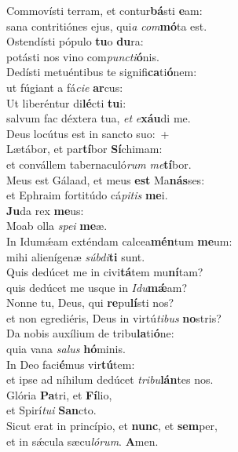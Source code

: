 \evenverse Commovísti terram, et contur\textbf{bá}sti \textbf{e}am:~\*\\
\evenverse sana contritiónes ejus, qui\textit{a} \textit{com}\textbf{mó}ta est.\\
\oddverse Ostendísti pópulo \textbf{tu}o \textbf{du}ra:~\*\\
\oddverse potásti nos vino com\textit{pun}\textit{cti}\textbf{ó}nis.\\
\evenverse Dedísti metuéntibus te signifi\textbf{ca}ti\textbf{ó}nem:~\*\\
\evenverse ut fúgiant a fá\textit{ci}\textit{e} \textbf{ar}cus:\\
\oddverse Ut liberéntur di\textbf{lé}cti \textbf{tu}i:~\*\\
\oddverse salvum fac déxtera tua, \textit{et} \textit{e}\textbf{xáu}di me.\\
\evenverse Deus locútus est in sancto suo:~+\\
\evenverse  Lætábor, et par\textbf{tí}bor \textbf{Sí}chimam:~\*\\
\evenverse et convállem tabernaculó\textit{rum} \textit{me}\textbf{tí}bor.\\
\oddverse Meus est Gálaad, et meus \textbf{est} Ma\textbf{nás}ses:~\*\\
\oddverse et Ephraim fortitúdo cá\textit{pi}\textit{tis} \textbf{me}i.\\
\evenverse \textbf{Ju}da rex \textbf{me}us:~\*\\
\evenverse Moab olla \textit{spe}\textit{i} \textbf{me}æ.\\
\oddverse In Idumǽam exténdam calcea\textbf{mén}tum \textbf{me}um:~\*\\
\oddverse mihi alienígenæ \textit{súb}\textit{di}\textbf{ti} sunt.\\
\evenverse Quis dedúcet me in civi\textbf{tá}tem mu\textbf{ní}tam?~\*\\
\evenverse quis dedúcet me usque in \textit{I}\textit{du}\textbf{mǽ}am?\\
\oddverse Nonne tu, Deus, qui \textbf{re}pu\textbf{lí}sti nos?~\*\\
\oddverse et non egrediéris, Deus in virtú\textit{ti}\textit{bus} \textbf{no}stris?\\
\evenverse Da nobis auxílium de tribu\textbf{la}ti\textbf{ó}ne:~\*\\
\evenverse quia vana \textit{sa}\textit{lus} \textbf{hó}minis.\\
\oddverse In Deo faci\textbf{é}mus vir\textbf{tú}tem:~\*\\
\oddverse et ipse ad níhilum dedúcet \textit{tri}\textit{bu}\textbf{lán}tes nos.\\
\evenverse Glória \textbf{Pa}tri, et \textbf{Fí}lio,~\*\\
\evenverse et Spirí\textit{tu}\textit{i} \textbf{San}cto.\\
\oddverse Sicut erat in princípio, et \textbf{nunc}, et \textbf{sem}per,~\*\\
\oddverse et in sǽcula sæcu\textit{ló}\textit{rum}. \textbf{A}men.\\
